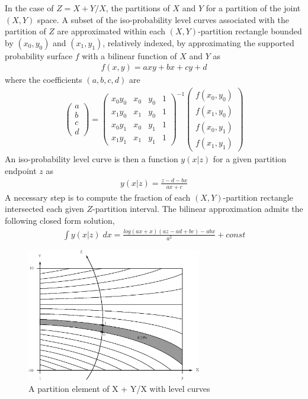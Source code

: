 In the case of $Z = X + Y/X$, the partitions of $X$ and $Y$ for a partition of the joint $(X,Y)$ space. A subset of the iso-probability level curves associated with the partition of $Z$ are approximated within each $(X,Y)$-partition rectangle bounded by $(x_0, y_0)$ and $(x_1, y_1)$, relatively indexed, by approximating the supported probability surface $f$ with a bilinear function of $X$ and $Y$ as
\begin{align*}
f(x,y) = axy + bx + cy + d
\end{align*}
where the coefficients $(a,b,c,d)$ are
\begin{align*}
\begin{pmatrix}a\\b\\c\\d\end{pmatrix} = 
  \begin{pmatrix}x_0 y_0 & x_0 & y_0 & 1\\
                 x_1 y_0 & x_1 & y_0 & 1\\
                 x_0 y_1 & x_0 & y_1 & 1\\
                 x_1 y_1 & x_1 & y_1 & 1
  \end{pmatrix} ^ {-1} 
  \begin{pmatrix}
    f(x_0, y_0)\\f(x_1, y_0)\\f(x_0, y_1)\\f(x_1, y_1)
  \end{pmatrix}
\end{align*}
An iso-probability level curve is then a function $y(x | z)$ for a given partition endpoint $z$ as
\begin{align*}
y(x | z) = \frac{z - d - bx}{ax + c}
\end{align*}
A necessary step is to compute the fraction of each $(X,Y)$-partition rectangle intersected each given $Z$-partition interval. The bilinear approximation admits the following closed form solution,
\begin{align*}
\int y(x | z) \; dx = \frac{log(ax+x)(az - ad + bc)-abx}{a^2} + const
\end{align*}

\begin{figure}
  \centering
  \includegraphics[width=3in]{Images/XpY_Zrectangle.eps}
  \caption[A partition element of X + Y/X with level curves]
          {A partition element of X + Y/X with level curves}
  \label{fig:XpY_Zrectangle}
\end{figure}

